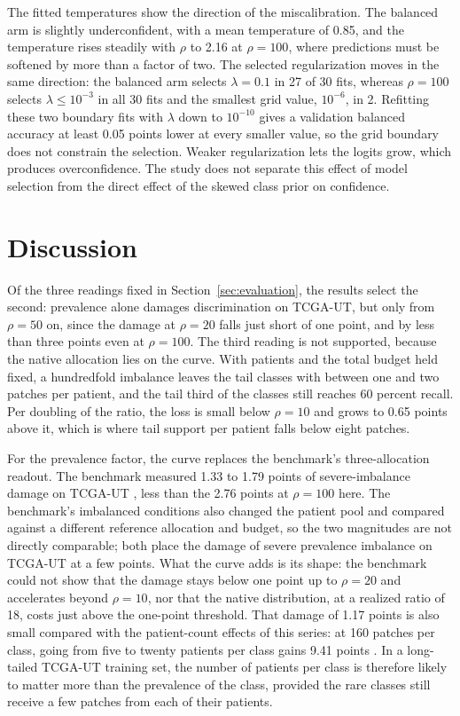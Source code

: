 The fitted temperatures show the direction of the miscalibration. The balanced arm is slightly underconfident, with a mean temperature of 0.85, and the temperature rises steadily with $\rho$ to 2.16 at $\rho=100$, where predictions must be softened by more than a factor of two. The selected regularization moves in the same direction: the balanced arm selects $\lambda=0.1$ in 27 of 30 fits, whereas $\rho=100$ selects $\lambda\leq10^{-3}$ in all 30 fits and the smallest grid value, $10^{-6}$, in 2. Refitting these two boundary fits with $\lambda$ down to $10^{-10}$ gives a validation balanced accuracy at least 0.05 points lower at every smaller value, so the grid boundary does not constrain the selection. Weaker regularization lets the logits grow, which produces overconfidence. The study does not separate this effect of model selection from the direct effect of the skewed class prior on confidence.

\section{Discussion}
\label{sec:discussion}
Of the three readings fixed in Section~\ref{sec:evaluation}, the results select the second: prevalence alone damages discrimination on TCGA-UT, but only from $\rho=50$ on, since the damage at $\rho=20$ falls just short of one point, and by less than three points even at $\rho=100$. The third reading is not supported, because the native allocation lies on the curve. With patients and the total budget held fixed, a hundredfold imbalance leaves the tail classes with between one and two patches per patient, and the tail third of the classes still reaches 60 percent recall. Per doubling of the ratio, the loss is small below $\rho=10$ and grows to 0.65 points above it, which is where tail support per patient falls below eight patches.

For the prevalence factor, the curve replaces the benchmark's three-allocation readout. The benchmark measured 1.33 to 1.79 points of severe-imbalance damage on TCGA-UT \citep{queisler2026benchmarkResults}, less than the 2.76 points at $\rho=100$ here. The benchmark's imbalanced conditions also changed the patient pool and compared against a different reference allocation and budget, so the two magnitudes are not directly comparable; both place the damage of severe prevalence imbalance on TCGA-UT at a few points. What the curve adds is its shape: the benchmark could not show that the damage stays below one point up to $\rho=20$ and accelerates beyond $\rho=10$, nor that the native distribution, at a realized ratio of 18, costs just above the one-point threshold. That damage of 1.17 points is also small compared with the patient-count effects of this series: at 160 patches per class, going from five to twenty patients per class gains 9.41 points \citep{queisler2026centreError}. In a long-tailed TCGA-UT training set, the number of patients per class is therefore likely to matter more than the prevalence of the class, provided the rare classes still receive a few patches from each of their patients.

